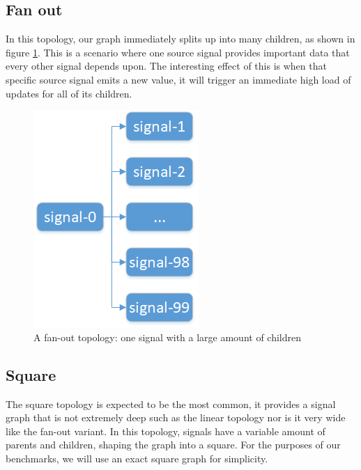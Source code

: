 \subsection{Fan out}

In this topology, our graph immediately splits up into many children, as shown in figure \ref{fig:evaluation-topologies-fanout}. This is a scenario where one source signal provides important data that every other signal depends upon. The interesting effect of this is when that specific source signal emits a new value, it will trigger an immediate high load of updates for all of its children. 

\begin{figure}[h]
	\centerline{\includegraphics[scale=0.7]{images/Evaluation-Topologies-Fanout.png}}
	\caption{A fan-out topology: one signal with a large amount of children}
	\label{fig:evaluation-topologies-fanout}
\end{figure}

\subsection{Square}

The square topology is expected to be the most common, it provides a signal graph that is not extremely deep such as the linear topology nor is it very wide like the fan-out variant. In this topology, signals have a variable amount of parents and children, shaping the graph into a square. For the purposes of our benchmarks, we will use an exact square graph for simplicity.  

